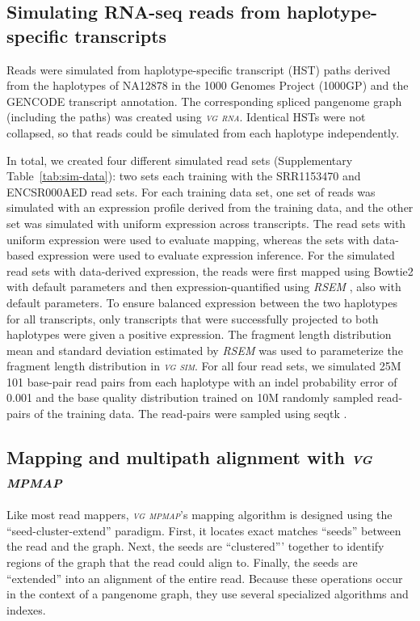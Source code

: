 \documentclass[11pt]{ucthesis}
\newcommand{\tool}[1]{\emph{\textsc{#1}}}
\begin{document}
\subsection{Simulating RNA-seq reads from haplotype-specific transcripts}

Reads were simulated from haplotype-specific transcript (HST) paths derived from the haplotypes of NA12878 in the 1000 Genomes Project (1000GP) and the GENCODE transcript annotation. The corresponding spliced pangenome graph (including the paths) was created using \tool{vg rna}. Identical HSTs were not collapsed, so that reads could be simulated from each haplotype independently. 

In total, we created four different simulated read sets (Supplementary Table~\ref{tab:sim-data}): two sets each training with the SRR1153470 and ENCSR000AED read sets. For each training data set, one set of reads was simulated with an expression profile derived from the training data, and the other set was simulated with uniform expression across transcripts. The read sets with uniform expression were used to evaluate mapping, whereas the sets with data-based expression were used to evaluate expression inference. For the simulated read sets with data-derived expression, the reads were first mapped using Bowtie2 \cite{langmead2012fast} with default parameters and then expression-quantified using \tool{RSEM} \cite{li2011rsem}, also with default parameters. To ensure balanced expression between the two haplotypes for all transcripts, only transcripts that were successfully projected to both haplotypes were given a positive expression. The fragment length distribution mean and standard deviation estimated by \tool{RSEM} was used to parameterize the fragment length distribution in \tool{vg sim}. For all four read sets, we simulated 25M 101 base-pair read pairs from each haplotype with an indel probability error of 0.001 and the base quality distribution trained on 10M randomly sampled read-pairs of the training data. The read-pairs were sampled using seqtk \cite{seqtk}. 

\subsection{Mapping and multipath alignment with \tool{vg mpmap}}

Like most read mappers, \tool{vg mpmap}'s mapping algorithm is designed using the ``seed-cluster-extend'' paradigm. First, it locates exact matches ``seeds'' between the read and the graph. Next, the seeds are ``clustered''' together to identify regions of the graph that the read could align to. Finally, the seeds are ``extended'' into an alignment of the entire read. Because these operations occur in the context of a pangenome graph, they use several specialized algorithms and indexes.
\end{document}

